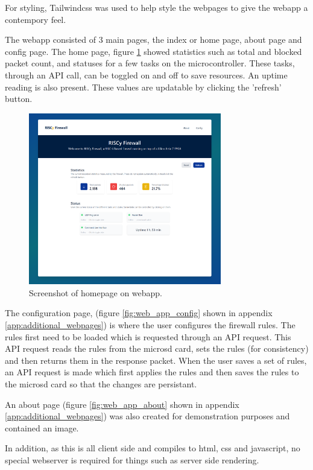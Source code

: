 For styling, Tailwindcss was used to help style the webpages to give the webapp a contempory feel. 

The webapp consisted of 3 main pages, the index or home page, about page and config page. The home page, figure \ref{fig:webapp_home} showed statistics such as total and blocked packet count, and statuses for a few tasks on the microcontroller. These tasks, through an API call, can be toggled on and off to save resources. An uptime reading is also present. These values are updatable by clicking the 'refresh' button.

\begin{figure}[h!]
    \centering
    \includegraphics[width=0.75\textwidth]{Images/homepage_small.png}
    \caption[Screenshot of homepage on webapp]{Screenshot of homepage on webapp.}
    \label{fig:webapp_home}
\end{figure}

The configuration page, (figure \ref{fig:web_app_config} shown in appendix \ref{app:additional_webpages}) is where the user configures the firewall rules. The rules first need to be loaded which is requested through an API request. This API request reads the rules from the microsd card, sets the rules (for consistency) and then returns them in the response packet. When the user saves a set of rules, an API request is made which first applies the rules and then saves the rules to the microsd card so that the changes are persistant. 

An about page (figure \ref{fig:web_app_about} shown in appendix \ref{app:additional_webpages}) was also created for demonstration purposes and contained an image.

In addition, as this is all client side and compiles to html, css and javascript, no special webserver is required for things such as server side rendering.


